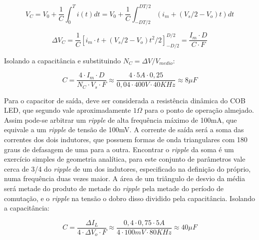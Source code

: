 \documentclass[
        12pt,
        openany, %
        oneside, %
        a4paper,			
        english,			
        brazil
        ]{abntbibufjf}
\begin{document}
\begin{equation}
V_{C} = V_0 + \frac{1}{C} \int_{0}^{T} i(t) dt =
V_0 + \frac{1}{C} \int_{-DT/2}^{DT/2} (i_m + (V_s/2-V_o)t) dt
\end{equation}

\begin{equation}
\Delta V_C = \frac{1}{C} [i_m \cdot t + (V_s/2-V_o)t^2/2]^{D/2}_{-D/2} = \frac{I_m \cdot D}{C \cdot F}
\end{equation}

Isolando a capacitância e substituindo $N_C = \Delta V / V_{medio}$:


\begin{equation}
C = \frac{4 \cdot I_m \cdot D}{N_C \cdot V_s \cdot F} \approx 
\frac{4 \cdot 5A \cdot 0,25}{0,04 \cdot 400V \cdot 40KHz} \approx 8 \mu F
\label{cap_ac}
\end{equation}






Para o capacitor de saída, deve ser considerada a resistência dinâmica do COB LED, que segundo \cite{denis} vale aproximadamente $1 \Omega$ para o ponto de operação almejado. Assim pode-se arbitrar um \textit{ripple} de alta frequência máximo de 100mA, que equivale a um \textit{ripple} de tensão de 100mV. A corrente de saída será a soma das correntes dos dois indutores, que possuem formas de onda triangulares com 180 graus de defasagem de uma para a outra. Encontrar o \textit{ripple} da soma é um exercício simples de geometria analítica, para este conjunto de parâmetros vale cerca de 3/4 do \textit{ripple} de um dos indutores, especificado na definição do próprio, numa frequência duas vezes maior. A área de um triângulo de desvio da média será metade do produto de metade do \textit{ripple} pela metade do período de comutação, e o \textit{ripple} na tensão o dobro disso dividido pela capacitância. Isolando a capacitância:

\begin{equation}
C = \frac{\Delta I_L}{4 \cdot \Delta V_o \cdot F} \approx 
\frac{0,4 \cdot 0,75 \cdot 5A}{4 \cdot 100mV \cdot 80KHz} \approx 40 \mu F
\end{equation}
\end{document}

